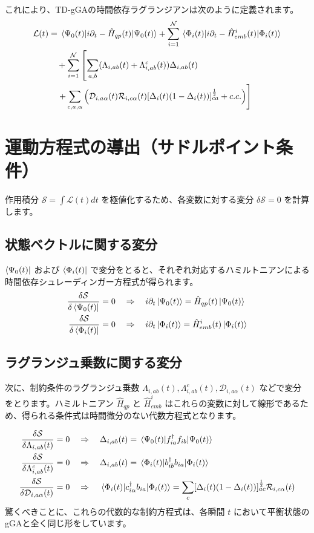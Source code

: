 \documentclass[a4paper,11pt]{ltjarticle}
\begin{document}
これにより、TD-gGAの時間依存ラグランジアンは次のように定義されます。
\begin{align}
\mathcal{L}(t) &= \mel{\Psi_0(t)}{i\partial_t - \hat{H}_{qp}(t)}{\Psi_0(t)} + \sum_{i=1}^{\mathcal{N}} \mel{\Phi_i(t)}{i\partial_t - \hat{H}_{emb}^i(t)}{\Phi_i(t)} \notag \\
&\quad + \sum_{i=1}^{\mathcal{N}} \left[ \sum_{a,b} (\Lambda_{i,ab}(t) + \Lambda_{i,ab}^c(t))\Delta_{i,ab}(t) \right. \notag \\
&\quad \left. + \sum_{c,a,\alpha} \left( \mathcal{D}_{i,a\alpha}(t) \mathcal{R}_{i,c\alpha}(t) [\Delta_i(t)(1-\Delta_i(t))]_{ca}^{\frac{1}{2}} + c.c. \right) \right]
\label{eq:L_td}
\end{align}

\section{運動方程式の導出（サドルポイント条件）}
作用積分 $\mathcal{S} = \int \mathcal{L}(t) dt$ を極値化するため、各変数に対する変分 $\delta \mathcal{S} = 0$ を計算します。

\subsection{状態ベクトルに関する変分}
$\bra{\Psi_0(t)}$ および $\bra{\Phi_i(t)}$ で変分をとると、それぞれ対応するハミルトニアンによる時間依存シュレーディンガー方程式が得られます。
\begin{align}
\frac{\delta \mathcal{S}}{\delta \bra{\Psi_0(t)}} = 0 \quad &\Rightarrow \quad i\partial_t \ket{\Psi_0(t)} = \hat{H}_{qp}(t) \ket{\Psi_0(t)} \label{eq:eom_psi} \\
\frac{\delta \mathcal{S}}{\delta \bra{\Phi_i(t)}} = 0 \quad &\Rightarrow \quad i\partial_t \ket{\Phi_i(t)} = \hat{H}_{emb}^i(t) \ket{\Phi_i(t)} \label{eq:eom_phi}
\end{align}

\subsection{ラグランジュ乗数に関する変分}
次に、制約条件のラグランジュ乗数 $\Lambda_{i,ab}(t), \Lambda_{i,ab}^c(t), \mathcal{D}_{i,a\alpha}(t)$ などで変分をとります。ハミルトニアン $\hat{H}_{qp}$ と $\hat{H}_{emb}^i$ はこれらの変数に対して線形であるため、得られる条件式は時間微分のない代数方程式となります。

\begin{align}
\frac{\delta \mathcal{S}}{\delta \Lambda_{i,ab}(t)} = 0 \quad &\Rightarrow \quad \Delta_{i,ab}(t) = \mel{\Psi_0(t)}{f_{ia}^\dagger f_{ib}}{\Psi_0(t)} \\
\frac{\delta \mathcal{S}}{\delta \Lambda_{i,ab}^c(t)} = 0 \quad &\Rightarrow \quad \Delta_{i,ab}(t) = \mel{\Phi_i(t)}{b_{ib}^\dagger b_{ia}}{\Phi_i(t)} \\
\frac{\delta \mathcal{S}}{\delta \mathcal{D}_{i,a\alpha}(t)} = 0 \quad &\Rightarrow \quad \mel{\Phi_i(t)}{c_{i\alpha}^\dagger b_{ia}}{\Phi_i(t)} = \sum_{c} [\Delta_i(t)(1-\Delta_i(t))]_{ac}^{\frac{1}{2}} \mathcal{R}_{i,c\alpha}(t)
\end{align}
驚くべきことに、これらの代数的な制約方程式は、各瞬間 $t$ において平衡状態のgGAと全く同じ形をしています。
\end{document}
